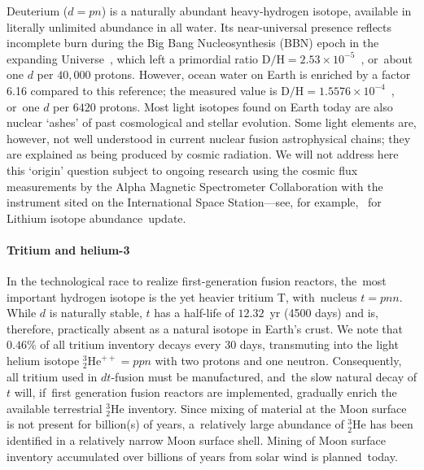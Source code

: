 \documentclass[particles,article,accept,pdftex,moreauthors]{Definitions/mdpi}
\begin{document}
Deuterium ($d=pn$) is a naturally abundant heavy-hydrogen isotope, available in literally unlimited abundance in all water. Its near-universal presence reflects incomplete burn during the Big Bang Nucleosynthesis (BBN) epoch in the expanding Universe~\cite{Rafelski:2023emw,Rafelski:2024fej}, which left a primordial ratio $\mathrm{D}/\mathrm{H}=2.53\times10^{-5}$~\cite{Cooke:2017cwo}, or~about one $d$ per $40{,}000$ protons. However, ocean water on Earth is enriched by a factor 6.16 compared to this reference; the measured value is $\mathrm{D}/\mathrm{H}=1.5576\times10^{-4}$~\cite{Meija:2016}, or~one $d$ per $6420$ protons. Most light isotopes found on Earth today are also nuclear `ashes' of past cosmological and stellar evolution. Some light elements are, however, not well understood in current nuclear fusion astrophysical chains; they are explained as being produced by cosmic radiation. We will not address here this `origin' question subject to ongoing research using the cosmic flux measurements by the Alpha Magnetic Spectrometer Collaboration with the instrument sited on the International Space Station---see, for example,~\cite{AMS:2025xoq} for Lithium isotope abundance~update.

\vspace{-6pt}\paragraph*{\bf Tritium and helium-3}
In the technological race to realize first-generation fusion reactors, the~most important hydrogen isotope is the yet heavier tritium T, with~nucleus $t=pnn$. While $d$ is naturally stable, $t$ has a half-life of $12.32$~yr (4500 days) and is, therefore, practically absent as a natural isotope in Earth's crust. We note that $0.46\%$ of all tritium inventory decays every 30 days, transmuting into the light helium isotope ${}^3_2\mathrm{He}^{++}=ppn$ with two protons and one neutron. Consequently, all tritium used in $dt$-fusion must be manufactured, and~the slow natural decay of $t$ will, if~first generation fusion reactors are implemented, gradually enrich the available terrestrial ${}^3_2$He inventory. Since mixing of material at the Moon surface is not present for billion(s) of years, a~relatively large abundance of ${}^3_2$He has been identified in a relatively narrow Moon surface shell. Mining of Moon surface inventory accumulated over billions of years from solar wind is planned~today.
\end{document}
